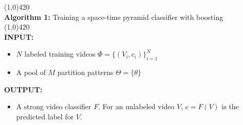 \documentclass[12pt]{article} %
\begin{document}
  \footnotesize
  \noindent\line(1,0){420}\\
  \textbf{Algorithm 1:} Training a space-time pyramid classifier with boosting \\
  \line(1,0){420}\\
  \textbf{\scriptsize INPUT:}
  \begin{itemize}
    \item $N$ labeled training videos $\Phi = \{(V_i, c_i)\}_{i=1}^N$
    \item A pool of $M$ partition patterns $\Theta = \{\theta\}$
  \end{itemize}
  \textbf{\scriptsize OUTPUT:}
  \begin{itemize}
    \item A strong video classifier $F$. For an unlabeled video $V$,
      $c=F(V)$ is the predicted label for $V$.
  \end{itemize}
\end{document}
